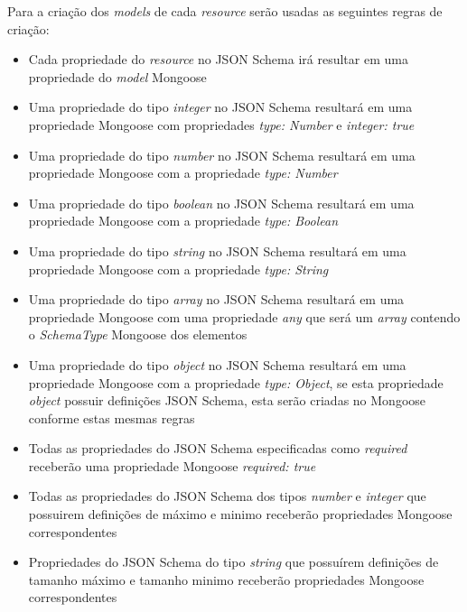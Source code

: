 \label{sec:bnf:mongo}

Para a criação dos \textit{models} de cada \textit{resource} serão usadas as seguintes regras de criação:
\begin{itemize}
    \item Cada propriedade do \textit{resource} no JSON Schema irá resultar em uma propriedade do \textit{model} Mongoose

    \item Uma propriedade do tipo \textit{integer} no JSON Schema resultará em uma propriedade Mongoose com propriedades \textit{type: Number} e \textit{integer: true}

    \item Uma propriedade do tipo \textit{number} no JSON Schema resultará em uma propriedade Mongoose com a propriedade \textit{type: Number}

    \item Uma propriedade do tipo \textit{boolean} no JSON Schema resultará em uma propriedade Mongoose com a propriedade \textit{type: Boolean}

    \item Uma propriedade do tipo \textit{string} no JSON Schema resultará em uma propriedade Mongoose com a propriedade \textit{type: String}

    \item Uma propriedade do tipo \textit{array} no JSON Schema resultará em uma propriedade Mongoose com uma propriedade \textit{any} que será um \textit{array} contendo o \textit{SchemaType} Mongoose dos elementos

    \item Uma propriedade do tipo \textit{object} no JSON Schema resultará em uma propriedade Mongoose com a propriedade \textit{type: Object}, se esta propriedade \textit{object} possuir definições JSON Schema, esta serão criadas no Mongoose conforme estas mesmas regras

    \item Todas as propriedades do JSON Schema especificadas como \textit{required} receberão uma propriedade Mongoose \textit{required: true}

    \item Todas as propriedades do JSON Schema dos tipos \textit{number} e \textit{integer} que possuirem definições de máximo e minimo receberão propriedades Mongoose correspondentes

    \item Propriedades do JSON Schema do tipo \textit{string} que possuírem definições de tamanho máximo e tamanho minimo receberão propriedades Mongoose correspondentes

\end{itemize}


